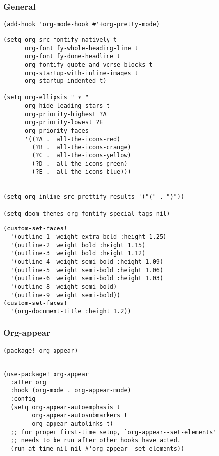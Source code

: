 \documentclass[c]{article}
\theoremstyle{plain}%
\theoremstyle{definition}
\theoremstyle{remark}
\begin{document}
\subsubsection{General}
\label{sec:orgbeab3c6}
\begin{verbatim}
(add-hook 'org-mode-hook #'+org-pretty-mode)
\end{verbatim}

\begin{verbatim}
(setq org-src-fontify-natively t
      org-fontify-whole-heading-line t
      org-fontify-done-headline t
      org-fontify-quote-and-verse-blocks t
      org-startup-with-inline-images t
      org-startup-indented t)

(setq org-ellipsis " ▾ "
      org-hide-leading-stars t
      org-priority-highest ?A
      org-priority-lowest ?E
      org-priority-faces
      '((?A . 'all-the-icons-red)
        (?B . 'all-the-icons-orange)
        (?C . 'all-the-icons-yellow)
        (?D . 'all-the-icons-green)
        (?E . 'all-the-icons-blue)))


(setq org-inline-src-prettify-results '("⟨" . "⟩"))

(setq doom-themes-org-fontify-special-tags nil)

\end{verbatim}

\begin{verbatim}
(custom-set-faces!
  '(outline-1 :weight extra-bold :height 1.25)
  '(outline-2 :weight bold :height 1.15)
  '(outline-3 :weight bold :height 1.12)
  '(outline-4 :weight semi-bold :height 1.09)
  '(outline-5 :weight semi-bold :height 1.06)
  '(outline-6 :weight semi-bold :height 1.03)
  '(outline-8 :weight semi-bold)
  '(outline-9 :weight semi-bold))
(custom-set-faces!
  '(org-document-title :height 1.2))
\end{verbatim}

\subsubsection{Org-appear}
\label{sec:org4bbf4bb}
\begin{verbatim}
(package! org-appear)
\end{verbatim}
\begin{verbatim}

(use-package! org-appear
  :after org
  :hook (org-mode . org-appear-mode)
  :config
  (setq org-appear-autoemphasis t
        org-appear-autosubmarkers t
        org-appear-autolinks t)
  ;; for proper first-time setup, `org-appear--set-elements'
  ;; needs to be run after other hooks have acted.
  (run-at-time nil nil #'org-appear--set-elements))
\end{verbatim}
\end{document}
